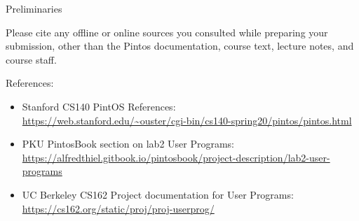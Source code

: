 \begin{titlepage}
\begin{aspect}{Preliminaries}
\begin{tcolorbox}
			Please cite any offline or online sources you consulted while
			preparing your submission, other than the Pintos documentation, course
			text, lecture notes, and course staff.
		\end{tcolorbox}
		References:
		\begin{itemize}
			\item Stanford CS140 PintOS References: \\
			      \url{https://web.stanford.edu/~ouster/cgi-bin/cs140-spring20/pintos/pintos.html}
			\item PKU PintosBook section on lab2 User Programs: \\
			      \url {https://alfredthiel.gitbook.io/pintosbook/project-description/lab2-user-programs}
			\item UC Berkeley CS162 Project documentation for User Programs: \\
			      \url {https://cs162.org/static/proj/proj-userprog/}
		\end{itemize}
	\end{aspect}

\end{titlepage}

